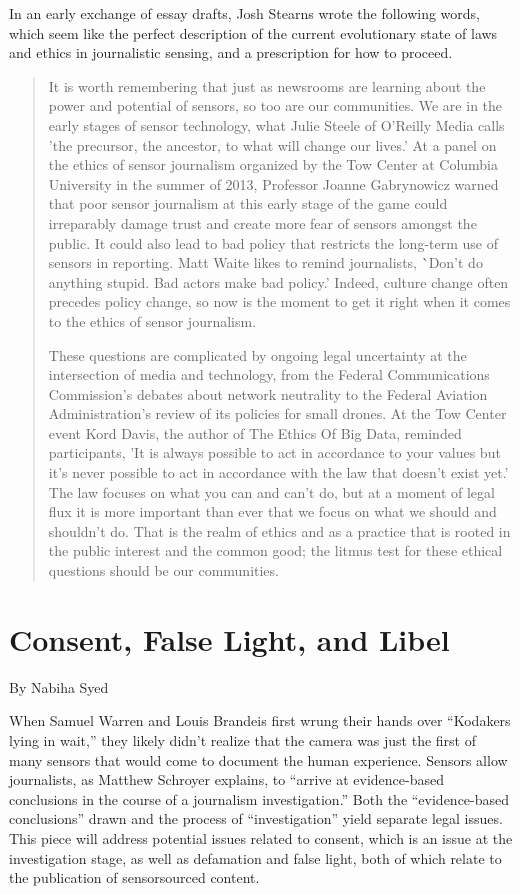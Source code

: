 In an early exchange of essay drafts, Josh Stearns wrote the following
words, which seem like the perfect description of the current evolutionary
state of laws and ethics in journalistic sensing, and a prescription for how
to proceed.
\begin{quote}
It is worth remembering that just as newsrooms are learning about
the power and potential of sensors, so too are our communities.
We are in the early stages of sensor technology, what Julie Steele of
O'Reilly Media calls 'the precursor, the ancestor, to what will change
our lives.' 
At a panel on the ethics of sensor journalism organized
by the Tow Center at Columbia University in the summer of 2013,
Professor Joanne Gabrynowicz warned that poor sensor journalism
at this early stage of the game could irreparably damage trust and
create more fear of sensors amongst the public. It could also lead to
bad policy that restricts the long-term use of sensors in reporting.
Matt Waite likes to remind journalists, \``Don't do anything stupid.
Bad actors make bad policy.' Indeed, culture change often precedes
policy change, so now is the moment to get it right when it comes to
the ethics of sensor journalism.

These questions are complicated by ongoing legal uncertainty at the
intersection of media and technology, from the Federal Communications
Commission's debates about network neutrality to the Federal
Aviation Administration's review of its policies for small drones. At
the Tow Center event Kord Davis, the author of The Ethics Of Big
Data, reminded participants, 'It is always possible to act in accordance
to your values but it's never possible to act in accordance with
the law that doesn't exist yet.' The law focuses on what you can and
can't do, but at a moment of legal flux it is more important than ever
that we focus on what we should and shouldn't do. That is the realm
of ethics and as a practice that is rooted in the public interest and the
common good; the litmus test for these ethical questions should be
our communities.
\end{quote}

\chapter{Consent, False Light, and Libel}
By Nabiha Syed

When Samuel Warren and Louis Brandeis first wrung their hands over
``Kodakers lying in wait,'' they likely didn't realize that the camera was just
the first of many sensors that would come to document the human experience. Sensors allow journalists, as Matthew Schroyer explains, to ``arrive at
evidence-based conclusions in the course of a journalism investigation.''
Both the ``evidence-based conclusions'' drawn and the process of ``investigation''
yield separate legal issues. This piece will address potential issues
related to consent, which is an issue at the investigation stage, as well as
defamation and false light, both of which relate to the publication of sensorsourced
content.

